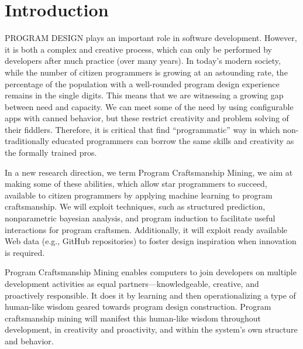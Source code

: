 \chapter{Introduction}{}
\label{sec:intro}

\lettrine[lraise=0.1, nindent=0em, slope=-.5em]{P}{ROGRAM DESIGN}  plays an 
important role in software development. However, it is both a complex and 
creative process, which can only be performed by developers after much 
practice (over many years). In today’s modern society, while the number of 
citizen programmers is growing at an astounding rate, the percentage of the 
population with a well-rounded program design experience remains in the single 
digits. This means that we are witnessing a growing gap between need and capacity. 
We can meet some of the need by using configurable apps with canned behavior, but 
these restrict creativity and problem solving of their fiddlers. Therefore, it is 
critical that find ``programmatic'' way in which non-traditionally educated 
programmers can borrow the same skills and creativity as the formally trained pros.   


In a new research direction, we term Program Craftsmanship Mining, we aim at 
making some of these abilities, which allow star programmers to succeed, available 
to citizen programmers by applying machine learning to program craftsmanship. We 
will exploit techniques, such as structured prediction, nonparametric bayesian 
analysis, and program induction to facilitate useful interactions for program 
craftsmen. Additionally, it will exploit ready available Web data (e.g., GitHub 
repositories) to foster design inspiration when innovation is required.

Program Craftsmanship Mining enables computers to join developers on multiple 
development activities as equal partners—knowledgeable, creative, and proactively 
responsible. It does it by learning and then operationalizing a type of human-like 
wisdom geared towards program design construction.  Program craftsmanship mining will 
manifest this human-like wisdom throughout development, in creativity and 
proactivity, and within the system’s own structure and behavior. 
